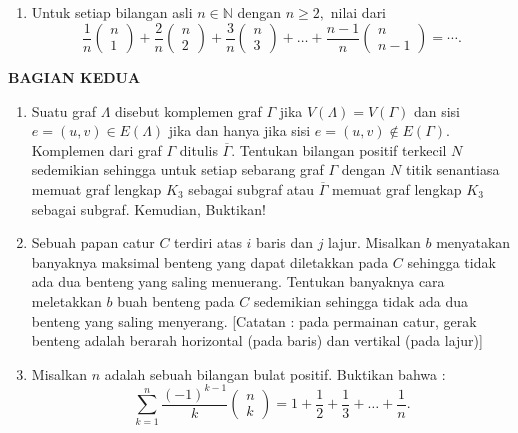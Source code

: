 \documentclass[12pt,twoside]{article}
\begin{document}
\begin{enumerate}
	\item Untuk setiap bilangan asli $n \in \mathbb{N}$ dengan $n \geq 2,$ nilai dari
	      \begin{equation*}
		      \dfrac{1}{n}\left( \begin{array}{cc}
				      n \\1
			      \end{array} \right) + \dfrac{2}{n}\left( \begin{array}{cc}
				      n \\2
			      \end{array} \right) + \dfrac{3}{n}\left( \begin{array}{cc}
				      n \\3
			      \end{array} \right) +\dots+ \dfrac{n-1}{n}\left( \begin{array}{cc}
				      n \\n-1
			      \end{array} \right)=\cdots.
	      \end{equation*}
\end{enumerate}

\newpage \textbf{BAGIAN KEDUA}
\begin{enumerate}
	\item Suatu graf $\Lambda$ disebut komplemen graf $\Gamma$ jika $V(\Lambda) = V(\Gamma)$ dan sisi $e=(u,v)\in E(\Lambda)$ jika dan hanya jika sisi $e=(u,v)\notin E(\Gamma)$. Komplemen dari graf $\Gamma$ ditulis $\overline{\Gamma}$. Tentukan bilangan positif terkecil $N$ sedemikian sehingga untuk setiap sebarang graf $\Gamma$ dengan $N$ titik senantiasa memuat graf lengkap $K_3$ sebagai subgraf atau $\overline{\Gamma}$ memuat graf lengkap $K_3$ sebagai subgraf. Kemudian, Buktikan!

	\item[2] Sebuah papan catur $C$ terdiri atas $i$ baris dan $j$ lajur. Misalkan $b$ menyatakan banyaknya maksimal benteng yang dapat diletakkan pada $C$ sehingga tidak ada dua benteng yang saling menuerang. Tentukan banyaknya cara meletakkan $b$ buah benteng pada $C$ sedemikian sehingga tidak ada dua benteng yang saling menyerang. [Catatan : pada permainan catur, gerak benteng adalah berarah horizontal (pada baris) dan vertikal (pada lajur)]

	\item Misalkan $n$ adalah sebuah bilangan bulat positif. Buktikan bahwa :
	      \begin{equation*}
		      \displaystyle\sum_{k=1}^{n} \dfrac{(-1)^{k-1}}{k} \left( \begin{array}{c}
				      n \\k
			      \end{array} \right) = 1 + \dfrac{1}{2} + \dfrac{1}{3} +\dots + \dfrac{1}{n}.
	      \end{equation*}
\end{enumerate}
\pagebreak
\end{document}
